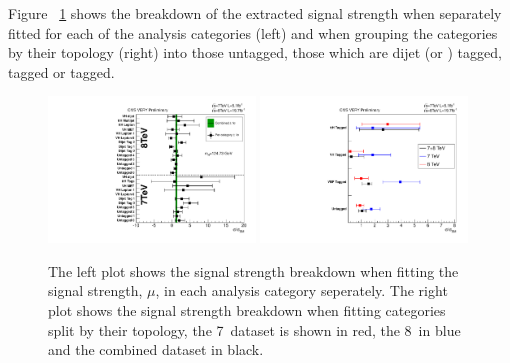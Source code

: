 Figure ~\ref{fig:res_chcomp} shows the breakdown of the extracted signal strength when separately fitted for each of the analysis categories (left) and when grouping the categories by their topology (right) into those untagged, those which are dijet (or \VBF) tagged, \VH tagged or \ttH tagged.

\begin{figure}
  \includegraphics[width=0.49\textwidth]{ch5_anal_and_results/plots/results/obschcomp.pdf}
  \includegraphics[width=0.49\textwidth]{ch5_anal_and_results/plots/results/obstoposcan.pdf}
  \caption{The left plot shows the signal strength breakdown when fitting the signal strength, $\mu$, in each analysis category seperately. The right plot shows the signal strength breakdown when fitting categories split by their topology, the 7~\TeV dataset is shown in red, the 8~\TeV in blue and the combined dataset in black.}
  \label{fig:res_chcomp}
\end{figure}

